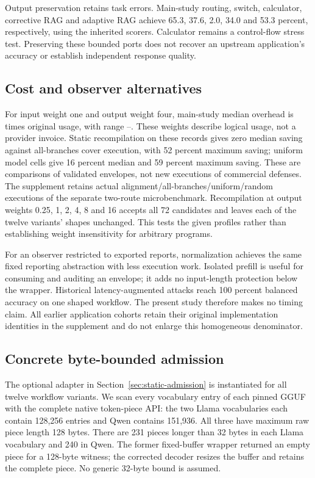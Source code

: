 Output preservation retains task errors. Main-study routing, switch, calculator,
corrective RAG and adaptive RAG achieve 65.3, 37.6, 2.0, 34.0 and 53.3 percent,
respectively, using the inherited scorers. Calculator remains a control-flow
stress test. Preserving these bounded ports does not recover an upstream
application's accuracy or establish independent response quality.

\subsection{Cost and observer alternatives}\label{sec:costs}

For input weight one and output weight four, main-study median overhead is
\roundTwoMedian{} times original usage, with range
\roundTwoMin{}--\roundTwoMax{}. These weights describe logical usage, not a
provider invoice. Static recompilation on these records gives zero median
saving against all-branches cover execution, with 52 percent maximum saving;
uniform model cells give 16 percent median and 59 percent maximum saving.
These are comparisons of validated envelopes, not new executions of commercial
defenses. The supplement retains actual alignment/all-branches/uniform/random
executions of the separate two-route microbenchmark.
Recompilation at output weights 0.25, 1, 2, 4, 8 and 16 accepts all 72 candidates
and leaves each of the twelve variants' shapes unchanged. This tests the given
profiles rather than establishing weight insensitivity for arbitrary programs.

For an observer restricted to exported reports, normalization achieves the same
fixed reporting abstraction with less execution work. Isolated prefill is useful
for consuming and auditing an envelope; it adds no input-length protection below
the wrapper. Historical latency-augmented attacks reach 100 percent balanced
accuracy on one shaped workflow. The present study therefore makes no timing
claim. All earlier application cohorts retain their original implementation
identities in the supplement and do not enlarge this homogeneous denominator.

\subsection{Concrete byte-bounded admission}\label{sec:concrete-admission}

The optional adapter in Section~\ref{sec:static-admission} is instantiated for
all twelve workflow variants. We scan every vocabulary entry of each pinned
GGUF with the complete native token-piece API: the two Llama vocabularies each
contain 128,256 entries and Qwen contains 151,936. All three have maximum raw
piece length 128 bytes. There are 231 pieces longer than 32 bytes in each Llama
vocabulary and 240 in Qwen. The former fixed-buffer wrapper returned an empty
piece for a 128-byte witness; the corrected decoder resizes the buffer and
retains the complete piece. No generic 32-byte bound is assumed.

